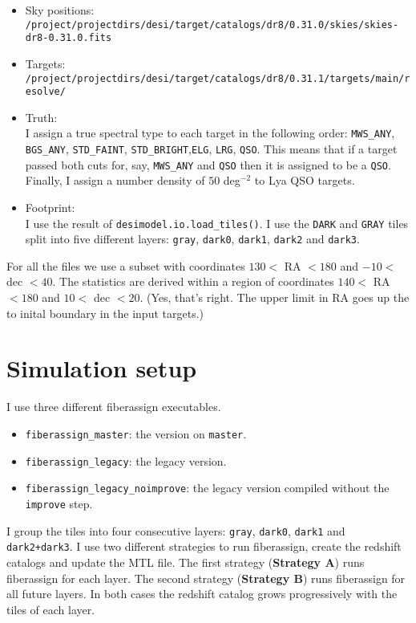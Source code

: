 \documentclass{article}
\begin{document}
\begin{itemize}
\item Sky positions: \\
\verb"/project/projectdirs/desi/target/catalogs/dr8/0.31.0/skies/skies-dr8-0.31.0.fits"
\item Targets:\\
\verb"/project/projectdirs/desi/target/catalogs/dr8/0.31.1/targets/main/resolve/"
\item Truth:\\
I assign a true spectral type to each target in the
following order:
\verb'MWS_ANY', \verb'BGS_ANY', \verb'STD_FAINT',
\verb'STD_BRIGHT',\verb'ELG', \verb'LRG', \verb'QSO'.
This means that if a target passed both cuts for, say, \verb'MWS_ANY' and
\verb'QSO' then it is assigned to be a \verb'QSO'.
Finally, I assign a number density of $50$ deg$^{-2}$
to Lya QSO targets.

\item Footprint:\\
I use the result of \verb'desimodel.io.load_tiles()'.
I use the \verb"DARK" and \verb"GRAY" tiles split into 
five different layers: \verb`gray`,
\verb'dark0', \verb'dark1', \verb'dark2' and \verb'dark3'.

\end{itemize}
For all the files we use a subset with coordinates 
$130<$ RA $<180$ and
$-10<$ dec $<40$. 
The statistics are derived within a region of coordinates 
$140<$ RA $<180$ and
$10<$ dec $<20$. (Yes, that's right. The upper limit in RA goes up the
to inital boundary in the input targets.)

\section{Simulation setup}

I use three different fiberassign executables.
\begin{itemize}
\item \verb"fiberassign_master": the version on \verb'master'.
\item \verb"fiberassign_legacy": the legacy version.
\item \verb'fiberassign_legacy_noimprove': the legacy version compiled
without the \verb'improve' step.
\end{itemize}

I group the tiles into four consecutive layers: \verb'gray', \verb'dark0',
\verb'dark1' and \verb'dark2+dark3'.
I use two different strategies to run fiberassign,  create the
redshift catalogs and update the MTL file. 
The first strategy (\textbf{Strategy A}) runs fiberassign for each
layer.
The second strategy (\textbf{Strategy B}) runs fiberassign for all
future layers.
In both cases the redshift catalog grows progressively with the tiles of each layer.
\end{document}
